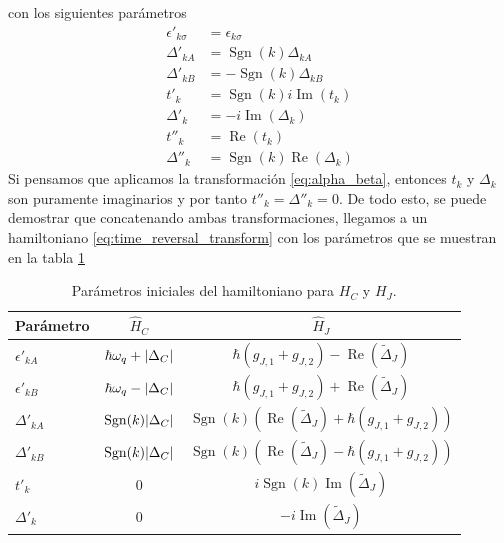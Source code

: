 con los siguientes parámetros
\begin{subequations}
  \begin{align}
    \epsilon'_{k\sigma} &= \epsilon_{k\sigma}\\
    \Delta'_{kA} &= \operatorname{Sgn}(k) \Delta_{kA}\\
    \Delta'_{kB} &= -\operatorname{Sgn}(k) \Delta_{kB}\\
    t'_k &= \operatorname{Sgn}(k)i\operatorname{Im}\left(t_k\right)\\
    \Delta'_k &= -i\operatorname{Im}\left(\Delta_k\right)\\
    t''_k &= \operatorname{Re}\left(t_k\right)\\
    \Delta''_k &= \operatorname{Sgn}(k) \operatorname{Re}\left(\Delta_k\right)
  \end{align}
\end{subequations}
Si pensamos que aplicamos la transformación \eqref{eq:alpha_beta}, entonces $t_k$ y $\Delta_k$ son puramente imaginarios y por tanto $t''_k = \Delta''_k =0$. De todo esto, se puede demostrar que concatenando ambas transformaciones, llegamos a un hamiltoniano \eqref{eq:time_reversal_transform} con los parámetros que se muestran en la tabla \ref{tab:parametros_finales}
\begin{table}[h]
\centering
\caption{Parámetros iniciales del hamiltoniano para $H_C$ y $H_J$.}
\label{tab:parametros_finales}
\begin{ruledtabular}
\begin{tabular}{l|c|c}
Parámetro & $\hat H_C$ & $\hat H_J$ \\
\hline
$\epsilon'_{kA}$ & $\hbar\omega_q + \abs{\Delta_C}$ & $\hbar(g_{J,1}+g_{J,2})-\operatorname{Re}(\tilde{\Delta}_J)$ \\
$\epsilon'_{kB}$ & $\hbar\omega_q - \abs{\Delta_C}$ & $\hbar(g_{J,1}+g_{J,2}) + \operatorname{Re}(\tilde{\Delta}_J)$ \\
$\Delta'_{kA}$ & $\operatorname{Sgn}(k)\abs{\Delta_{C}}$ & $\operatorname{Sgn}(k)\left(\operatorname{Re}(\tilde{\Delta}_J) + \hbar(g_{J,1}+g_{J,2})\right)$ \\
$\Delta'_{kB}$ & $\operatorname{Sgn}(k)\abs{\Delta_{C}}$ & $\operatorname{Sgn}(k)\left(\operatorname{Re}(\tilde{\Delta}_J) - \hbar(g_{J,1}+g_{J,2})\right)$ \\
$t'_k$ & $0$ & $i\operatorname{Sgn}(k)\operatorname{Im}(\tilde{\Delta}_J)$ \\
$\Delta'_k$ & $0$ & $-i\operatorname{Im}(\tilde{\Delta}_J)$ 
\end{tabular}
\end{ruledtabular}
\end{table}
